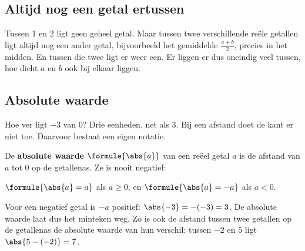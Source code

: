 \begin{oefeningen}
\end{oefeningen}

\subsection{Altijd nog een getal ertussen}

Tussen 1 en 2 ligt geen geheel getal. Maar tussen twee verschillende reële getallen ligt altijd nog een ander getal, bijvoorbeeld het gemiddelde $\tfrac{a + b}{2}$, precies in het midden. En tussen die twee ligt er weer een. Er liggen er dus oneindig veel tussen, hoe dicht $a$ en $b$ ook bij elkaar liggen.


\begin{oefeningen}
\end{oefeningen}

\subsection{Absolute waarde}

Hoe ver ligt $-3$ van 0? Drie eenheden, net als $3$. Bij een afstand doet de kant er niet toe. Daarvoor bestaat een eigen notatie.

\begin{theorie}
De \textbf{\textcolor{accent}{absolute waarde}} $\formule{\abs{a}}$ van een reëel getal $a$ is de afstand van $a$ tot 0 op de getallenas. Ze is nooit negatief:

\vspace{1mm}
\qquad $\formule{\abs{a} = a}$ als $a \geqslant 0$, \qquad en \qquad $\formule{\abs{a} = -a}$ als $a < 0$.
\end{theorie}

Voor een negatief getal is $-a$ positief: $\abs{-3} = -(-3) = 3$. De absolute waarde laat dus het minteken weg. Zo is ook de afstand tussen twee getallen op de getallenas de absolute waarde van hun verschil: tussen $-2$ en $5$ ligt $\abs{5 - (-2)} = 7$.

